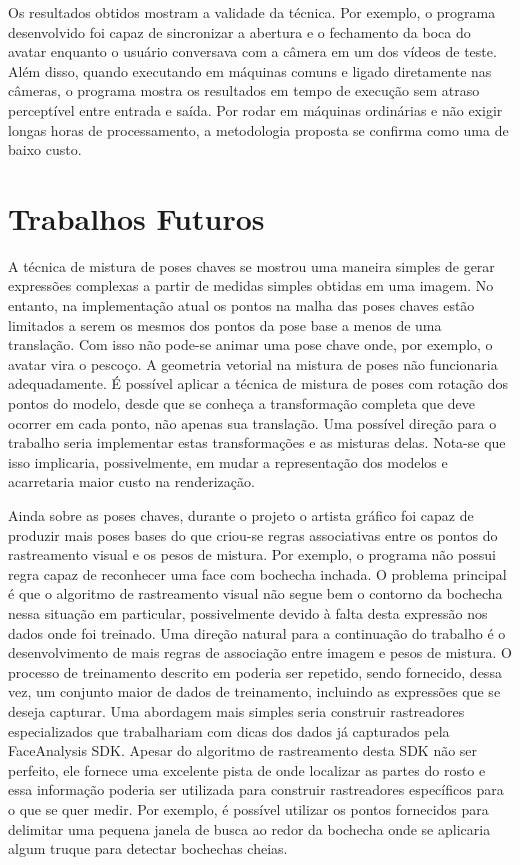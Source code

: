 Os resultados obtidos mostram a validade da técnica. Por exemplo, o programa
desenvolvido foi capaz de sincronizar a abertura e o fechamento da boca do
avatar enquanto o usuário conversava com a câmera em um dos vídeos de teste.
Além disso, quando executando em máquinas comuns e ligado diretamente nas
câmeras, o programa mostra os resultados em tempo de execução sem atraso
perceptível entre entrada e saída. Por rodar em máquinas ordinárias e não exigir
longas horas de processamento, a metodologia proposta se confirma como uma de
baixo custo.



\section{Trabalhos Futuros}

A técnica de mistura de poses chaves se mostrou uma maneira simples de gerar
expressões complexas a partir de medidas simples obtidas em uma imagem. No
entanto, na implementação atual os pontos na malha das poses chaves estão
limitados a serem os mesmos dos pontos da pose base a menos de uma translação.
Com isso não pode-se animar uma pose chave onde, por exemplo, o avatar vira o
pescoço. A geometria vetorial na mistura de poses não funcionaria adequadamente.
É possível aplicar a técnica de mistura de poses com rotação dos pontos do
modelo, desde que se conheça a transformação completa que deve ocorrer em cada
ponto, não apenas sua translação. Uma possível direção para o trabalho seria
implementar estas transformações e as misturas delas. Nota-se que isso
implicaria, possivelmente, em mudar a representação dos modelos e acarretaria
maior custo na renderização. 

Ainda sobre as poses chaves, durante o projeto o artista gráfico foi capaz de
produzir mais poses bases do que criou-se regras associativas entre os pontos do
rastreamento visual e os pesos de mistura. Por exemplo, o programa não possui
regra capaz de reconhecer uma face com bochecha inchada. O problema principal é
que o algoritmo de rastreamento visual não segue bem o contorno da bochecha
nessa situação em particular, possivelmente devido à falta desta expressão nos
dados onde foi treinado. Uma direção natural para a continuação do trabalho é o
desenvolvimento de mais regras de associação entre imagem e pesos de mistura. O
processo de treinamento descrito em \cite{facetracker} poderia ser repetido,
sendo fornecido, dessa vez, um conjunto maior de dados de treinamento, incluindo
as expressões que se deseja capturar. Uma abordagem mais simples seria construir
rastreadores especializados que trabalhariam com dicas dos dados já capturados
pela FaceAnalysis SDK. Apesar do algoritmo de rastreamento desta SDK não ser
perfeito, ele fornece uma excelente pista de onde localizar as partes do rosto e
essa informação poderia ser utilizada para construir rastreadores específicos
para o que se quer medir. Por exemplo, é possível utilizar os pontos fornecidos
para delimitar uma pequena janela de busca ao redor da bochecha onde se
aplicaria algum truque para detectar bochechas cheias.

